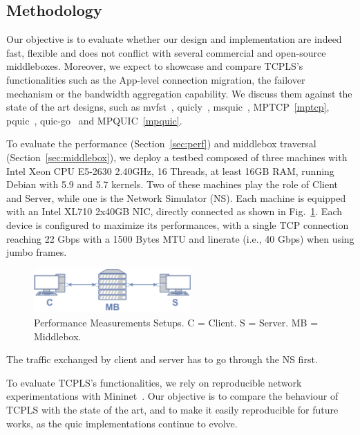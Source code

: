 


\subsection{Methodology}

Our objective is to evaluate whether our design and implementation are indeed
fast, flexible and does not conflict with several commercial and open-source
middleboxes. Moreover, we expect to showcase and compare TCPLS's functionalities
such as the App-level connection migration, the failover mechanism or the
bandwidth aggregation capability. We discuss them against the state
of the art designs, such as mvfst~\cite{mvfast}, quicly~\cite{quicly},
msquic~\cite{msquic}, MPTCP~\ref{mptcp}, pquic~\cite{pquic},
quic-go~\cite{quic-go} and MPQUIC~\ref{mpquic}.

To evaluate the performance (Section~\ref{sec:perf}) and middlebox traversal
(Section~\ref{sec:middlebox}), we deploy a testbed composed of three machines with Intel Xeon CPU E5-2630
2.40GHz, 16 Threads, at least 16GB RAM, running Debian with 5.9 and
5.7 kernels. Two of these machines play the role of Client and Server,
while one is the Network Simulator (NS). Each machine is equipped with an
Intel XL710 2x40GB NIC, directly connected as shown in
Fig.~\ref{fig:perf_testbed}.
Each device is configured to maximize its performances, with a single TCP connection
reaching 22 Gbps with a 1500 Bytes MTU and linerate (i.e., 40 Gbps) when
using jumbo frames.

\begin{figure}[!t]
  \begin{center}
    \includegraphics[width=6cm]{figures/testbed.png}
  \end{center}
  \vspace{-0.5cm}
  \caption{Performance Measurements Setups. C = Client. S = Server. MB = Middlebox.}
  \label{fig:perf_testbed}
    \vspace{-0.5cm}
\end{figure}

The traffic exchanged by client and server has to go through the NS first.

To evaluate TCPLS's functionalities, we rely on reproducible network
experimentations with Mininet~\cite{mininet}. Our objective is to compare the
behaviour of TCPLS with the state of the art, and to make it easily
reproducible for future works, as the quic implementations continue to evolve.

